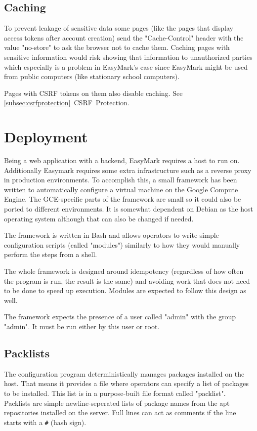 \documentclass[12pt,a4paper,oneside]{report}
\begin{document}
	\subsection{Caching}
	To prevent leakage of sensitive data some pages (like the pages that display access tokens after account creation) send the "Cache-Control" header with the value "no-store" to ask the browser not to cache them. Caching pages with sensitive information would risk showing that information to unauthorized parties which especially is a problem in EasyMark's case since EasyMark might be used from public computers (like stationary school computers).

	Pages with CSRF tokens on them also disable caching. See \ref{subsec:csrfprotection}~CSRF~Protection.

	\section{Deployment}
	Being a web application with a backend, EasyMark requires a host to run on. Additionally Easymark requires some extra infrastructure such as a reverse proxy in production environments. To accomplish this, a small framework has been written to automatically configure a virtual machine on the Google Compute Engine. The GCE-specific parts of the framework are small so it could also be ported to different environments. It is somewhat dependent on Debian as the host operating system although that can also be changed if needed.

	The framework is written in Bash and allows operators to write simple configuration scripts (called "modules") similarly to how they would manually perform the steps from a shell.

	The whole framework is designed around idempotency (regardless of how often the program is run, the result is the same) and avoiding work that does not need to be done to speed up execution. Modules are expected to follow this design as well.

	The framework expects the presence of a user called "admin" with the group "admin". It must be run either by this user or root.

	\subsection{Packlists}
	The configuration program deterministically manages packages installed on the host. That means it provides a file where operators can specify a list of packages to be installed. This list is in a purpose-built file format called "packlist". Packlists are simple newline-seperated lists of package names from the apt repositories installed on the server. Full lines can act as comments if the line starts with a \lstinline|#| (hash sign).
\end{document}
